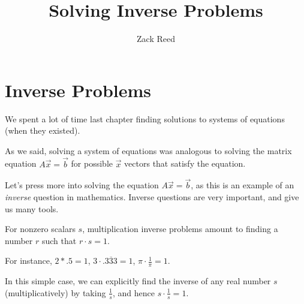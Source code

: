 \documentclass{ximera}
\author{Zack Reed}
\title{Solving Inverse Problems}
\begin{document}
\begin{abstract}



\end{abstract}
\maketitle


\section*{Inverse Problems}

We spent a lot of time last chapter finding solutions to systems of equations (when they existed).

As we said, solving a system of equations was analogous to solving the matrix equation $A\vec{x}=\vec{b}$ for possible $\vec{x}$ vectors that satisfy the equation. 

Let's press more into solving the equation $A\vec{x}=\vec{b}$, as this is an example of an \emph{inverse} question in mathematics. Inverse questions are very important, and give us many tools.

\begin{example}

  For nonzero scalars $s$, multiplication inverse problems amount to finding a number $r$ such that $r\cdot s=1$.

  For instance, $2*.5=1$, $3\cdot .\overline{333}=1$, $\pi\cdot \frac{1}{\pi}=1$. 

  In this simple case, we can explicitly find the inverse of any real number $s$ (multiplicatively) by taking $\frac{1}{s}$, and hence $s\cdot\frac{1}{s}=1$.

\end{example}
\end{document}
